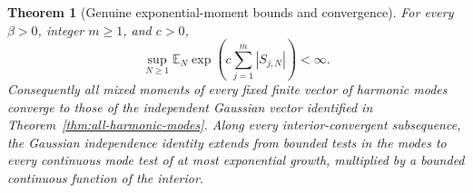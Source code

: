 \documentclass[11pt,a4paper]{article}
\numberwithin{equation}{section}
\newtheorem{theorem}{Theorem}[section]
\theoremstyle{definition}
\theoremstyle{remark}
\newcommand{\E}{\mathbb E}
\begin{document}
\begin{theorem}[Genuine exponential-moment bounds and convergence]
\label{thm:harmonic-exponential-moments}
For every $\beta>0$, integer $m\geq1$, and $c>0$,
\begin{equation}\label{eq:harmonic-exponential-bound}
 \sup_{N\geq1}\E_N\exp\!\left(c\sum_{j=1}^m|S_{j,N}|\right)<\infty.
\end{equation}
Consequently all mixed moments of every fixed finite vector of harmonic
modes converge to those of the independent Gaussian vector identified in
Theorem~\ref{thm:all-harmonic-modes}. Along every interior-convergent
subsequence, the Gaussian independence identity extends from bounded
tests in the modes to every continuous mode test of at most exponential
growth, multiplied by a bounded continuous function of the interior.
\end{theorem}
\end{document}
